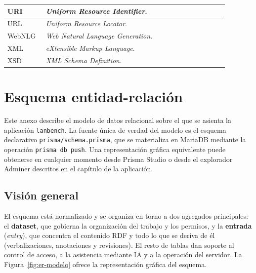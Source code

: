 \begin{longtable}{|p{0.16\linewidth}|p{0.76\linewidth}|}
	URI            & \textit{Uniform Resource Identifier}.                                                         \\ \hline
	URL            & \textit{Uniform Resource Locator}.                                                            \\ \hline
	WebNLG         & \textit{Web Natural Language Generation}.                                                     \\ \hline
	XML            & \textit{eXtensible Markup Language}.                                                          \\ \hline
	XSD            & \textit{XML Schema Definition}.                                                               \\ \hline
\end{longtable}

\chapter{Esquema entidad-relación}

Este anexo describe el modelo de datos relacional sobre el que se asienta la
aplicación \texttt{lanbench}. La fuente única de verdad del modelo es el
esquema declarativo \texttt{prisma/schema.prisma}, que se materializa en
MariaDB mediante la operación \texttt{prisma db push}. Una representación
gráfica equivalente puede obtenerse en cualquier momento desde Prisma Studio o
desde el explorador Adminer descritos en el capítulo de la aplicación.

\section{Visión general}

El esquema está normalizado y se organiza en torno a dos agregados principales:
el \textbf{dataset}, que gobierna la organización del trabajo y los permisos, y
la \textbf{entrada} (\textit{entry}), que concentra el contenido RDF y todo lo
que se deriva de él (verbalizaciones, anotaciones y revisiones). El resto de
tablas dan soporte al control de acceso, a la asistencia mediante IA y a la
operación del servidor. La Figura~\ref{fig:er-modelo} ofrece la representación
gráfica del esquema.

